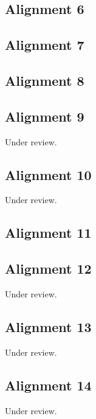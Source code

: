 \documentclass{scrartcl}
\begin{document}
\subsection{Alignment 6} %
\label{sec:align_6}
\clearpage

\subsection{Alignment 7} %
\label{sec:align_7}
\clearpage

\subsection{Alignment 8} %
\label{sec:align_8}
\clearpage

\subsection{Alignment 9} %
\label{sec:align_9}
Under review.%
\clearpage

\subsection{Alignment 10} %
\label{sec:align_10}
Under review.%
\clearpage

\subsection{Alignment 11} %
\label{sec:align_11}
\clearpage

\subsection{Alignment 12} %
\label{sec:align_12}
Under review.%
\clearpage

\subsection{Alignment 13} %
\label{sec:align_13}
Under review.%
\clearpage

\subsection{Alignment 14} %
\label{sec:align_14}
Under review.%
\clearpage
\end{document}
